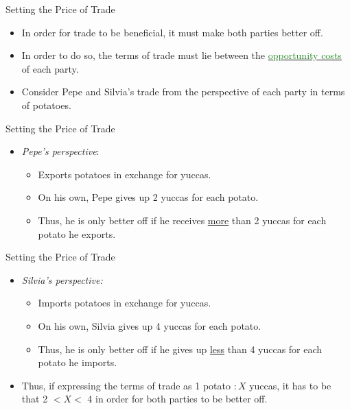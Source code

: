 \documentclass[xcolor={dvipsnames},pdf, hyperref={colorlinks=true, citecolor=ForestGreen, linkcolor=BlueViolet, urlcolor=Magenta}]{beamer}
\theoremstyle{definition}
\newcommand{\dd}[1]{{\underline{\textcolor{ForestGreen}{#1}}}}
\begin{document}
\begin{frame}{Setting the Price of Trade}
	
	\begin{itemize}
		\item In order for trade to be beneficial, it must make both parties better off. 
		\item In order to do so, the terms of trade must lie between the \dd{opportunity costs} of each party. 
		\item Consider Pepe and Silvia's trade from the perspective of each party in terms of potatoes.
	\end{itemize}
	
\end{frame}

\begin{frame}{Setting the Price of Trade}
	\begin{itemize}
		\item \textit{Pepe's perspective}:
			\begin{itemize}
				\item Exports potatoes in exchange for yuccas.
				\item On his own, Pepe gives up 2 yuccas for each potato.
				\item Thus, he is only better off if he receives \underline{more} than 2 yuccas for each potato he exports.
			\end{itemize}
	\end{itemize}
\end{frame}

\begin{frame}{Setting the Price of Trade}
\begin{itemize}
		\item \textit{Silvia's perspective:}
		\begin{itemize}
			\item Imports potatoes in exchange for yuccas.
			\item On his own, Silvia gives up 4 yuccas for each potato.
			\item Thus, he is only better off if he gives up \underline{less} than 4 yuccas for each potato he imports.
		\end{itemize}  
		
		\item Thus, if expressing the terms of trade as 1 potato $: X$ yuccas, it has to be that 2 $< X <$ 4 in order for both parties to be better off.
	\end{itemize}
\end{frame}
\end{document}
